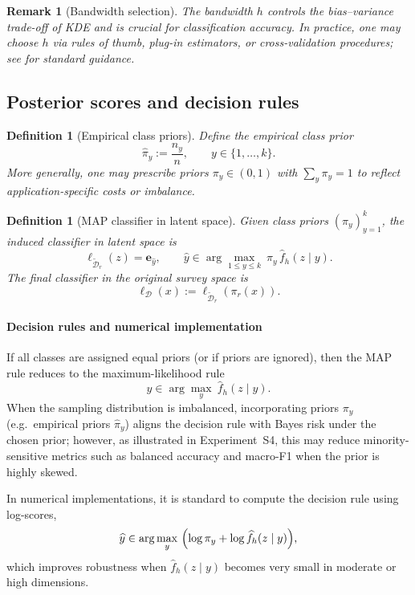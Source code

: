 \documentclass[preprint,11pt]{elsarticle}
\newtheorem{Definition}[Theorem]{Definition}
\newtheorem{Remark}[Theorem]{Remark}
\begin{document}
\begin{Remark}[Bandwidth selection]
The bandwidth $h$ controls the bias--variance trade-off of KDE and is crucial for classification accuracy.
In practice, one may choose $h$ via rules of thumb, plug-in estimators, or cross-validation procedures; see
\cite{Silverman1986,Scott2015,WandJones1995} for standard guidance.
\end{Remark}

\subsection{Posterior scores and decision rules}

\begin{Definition}[Empirical class priors]
\label{def:empirical_priors}
Define the empirical class prior
\[
\widehat \pi_y := \frac{n_y}{n},
\qquad y\in\{1,\dots,k\}.
\]
More generally, one may prescribe priors $\pi_y\in(0,1)$ with $\sum_y \pi_y=1$ to reflect application-specific costs or imbalance.
\end{Definition}

\begin{Definition}[MAP classifier in latent space]
\label{def:map_classifier}
Given class priors $(\pi_y)_{y=1}^k$, the induced classifier in latent space is
\[
\ell_{\widetilde{\mathcal D}_r}(z)
=
\mathbf e_{\widehat y},
\qquad
\widehat y \in \arg\max_{1\le y\le k}\ \pi_y\,\widehat f_h(z\mid y).
\]
The final classifier in the original survey space is
\[
\ell_{\mathcal D}(x):=\ell_{\widetilde{\mathcal D}_r}(\pi_r(x)).
\]
\end{Definition}

\paragraph{Decision rules and numerical implementation}
If all classes are assigned equal priors (or if priors are ignored), then the MAP rule reduces to the maximum-likelihood rule
\[
\widehat y \in \arg\max_{y}\ \widehat f_h(z\mid y).
\]
When the sampling distribution is imbalanced, incorporating priors $\pi_y$ (e.g.\ empirical priors $\widehat\pi_y$) aligns the decision rule
with Bayes risk under the chosen prior; however, as illustrated in Experiment~S4, this may reduce minority-sensitive metrics such as balanced
accuracy and macro-F1 when the prior is highly skewed.

In numerical implementations, it is standard to compute the decision rule using log-scores,
\[
\widehat y \in \arg\max_{y}\ \Bigl(\log \pi_y + \log \widehat f_h(z\mid y)\Bigr),
\]
which improves robustness when $\widehat f_h(z\mid y)$ becomes very small in moderate or high dimensions.
\end{document}
